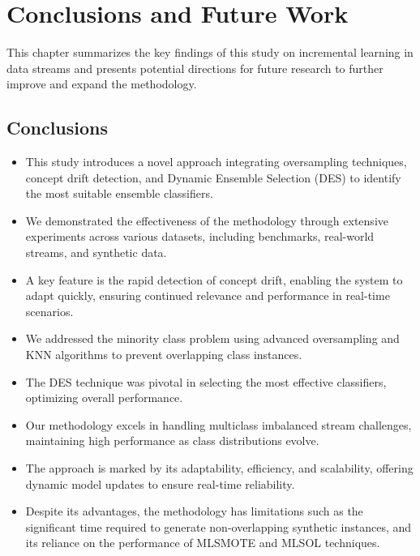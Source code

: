 \chapter{Conclusions and Future Work}
\label{chapter:7_Conclusions}
This chapter summarizes the key findings of this study on incremental learning in data streams and presents potential directions for future research to further improve and expand the methodology.

\section{Conclusions}
\label{section:7_1}
\begin{itemize}
    \setlength{\itemsep}{1.5pt}
    \setlength{\parskip}{1.5pt}
    \item This study introduces a novel approach integrating oversampling techniques, concept drift detection, and Dynamic Ensemble Selection (DES) to identify the most suitable ensemble classifiers.
    \item We demonstrated the effectiveness of the methodology through extensive experiments across various datasets, including benchmarks, real-world streams, and synthetic data.
    \item A key feature is the rapid detection of concept drift, enabling the system to adapt quickly, ensuring continued relevance and performance in real-time scenarios.
    \item We addressed the minority class problem using advanced oversampling and KNN algorithms to prevent overlapping class instances.
    \item The DES technique was pivotal in selecting the most effective classifiers, optimizing overall performance.
    \item Our methodology excels in handling multiclass imbalanced stream challenges, maintaining high performance as class distributions evolve.
    \item The approach is marked by its adaptability, efficiency, and scalability, offering dynamic model updates to ensure real-time reliability.
    \item Despite its advantages, the methodology has limitations such as the significant time required to generate non-overlapping synthetic instances, and its reliance on the performance of MLSMOTE and MLSOL techniques.
\end{itemize}

